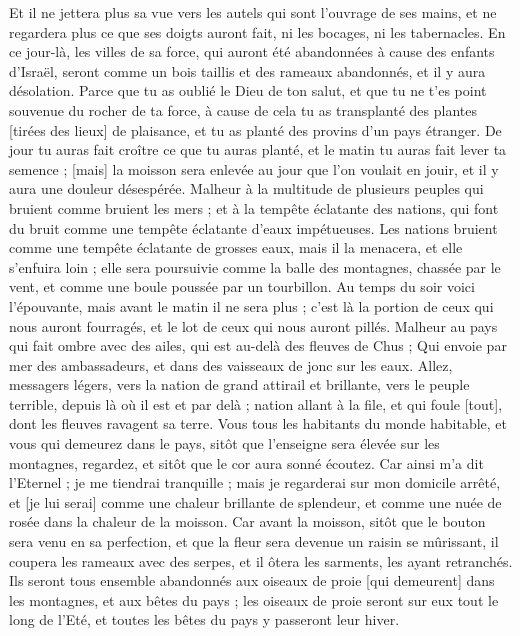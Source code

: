 \begin{multicols}{2}
Et il ne jettera plus sa vue vers les autels qui sont l'ouvrage de ses mains, et ne regardera plus ce que ses doigts auront fait, ni les bocages, ni les tabernacles.
En ce jour-là, les villes de sa force, qui auront été abandonnées à cause des enfants d'Israël, seront comme un bois taillis et des rameaux abandonnés, et il y aura désolation.
Parce que tu as oublié le Dieu de ton salut, et que tu ne t'es point souvenue du rocher de ta force, à cause de cela tu as transplanté des plantes [tirées des lieux] de plaisance, et tu as planté des provins d'un pays étranger.
De jour tu auras fait croître ce que tu auras planté, et le matin tu auras fait lever ta semence ; [mais] la moisson sera enlevée au jour que l'on voulait en jouir, et il y aura une douleur désespérée.
Malheur à la multitude de plusieurs peuples qui bruient comme bruient les mers ; et à la tempête éclatante des nations, qui font du bruit comme une tempête éclatante d'eaux impétueuses.
Les nations bruient comme une tempête éclatante de grosses eaux, mais il la menacera, et elle s'enfuira loin ; elle sera poursuivie comme la balle des montagnes, chassée par le vent, et comme une boule poussée par un tourbillon.
Au temps du soir voici l'épouvante, mais avant le matin il ne sera plus ; c'est là la portion de ceux qui nous auront fourragés, et le lot de ceux qui nous auront pillés.
\VerseOne{}Malheur au pays qui fait ombre avec des ailes, qui est au-delà des fleuves de Chus ;
Qui envoie par mer des ambassadeurs, et dans des vaisseaux de jonc sur les eaux. Allez, messagers légers, vers la nation de grand attirail et brillante, vers le peuple terrible, depuis là où il est et par delà ; nation allant à la file, et qui foule [tout], dont les fleuves ravagent sa terre.
Vous tous les habitants du monde habitable, et vous qui demeurez dans le pays, sitôt que l'enseigne sera élevée sur les montagnes, regardez, et sitôt que le cor aura sonné écoutez.
Car ainsi m'a dit l'Eternel ; je me tiendrai tranquille ; mais je regarderai sur mon domicile arrêté, et [je lui serai] comme une chaleur brillante de splendeur, et comme une nuée de rosée dans la chaleur de la moisson.
Car avant la moisson, sitôt que le bouton sera venu en sa perfection, et que la fleur sera devenue un raisin se mûrissant, il coupera les rameaux avec des serpes, et il ôtera les sarments, les ayant retranchés.
Ils seront tous ensemble abandonnés aux oiseaux de proie [qui demeurent] dans les montagnes, et aux bêtes du pays ; les oiseaux de proie seront sur eux tout le long de l'Eté, et toutes les bêtes du pays y passeront leur hiver.

\end{multicols}
